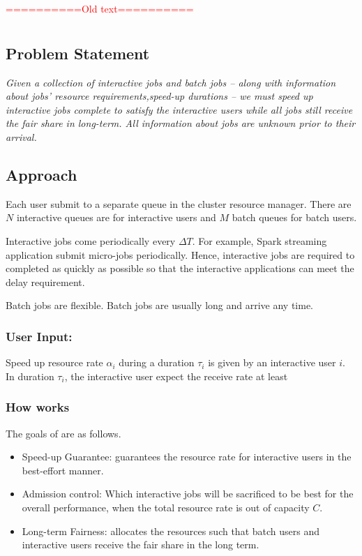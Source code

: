 \newpage

\textcolor{red}{==========Old text==========}

\section{}
\subsection{Problem Statement}
\emph{Given a collection of interactive jobs and batch jobs – along with information about jobs' resource requirements,speed-up durations – we must speed up interactive jobs complete to satisfy the interactive users while all jobs still receive the fair share in long-term. All information about jobs are unknown prior to their arrival.}

\subsection{Approach}

Each user submit to a separate queue in the cluster resource manager. There are $N$ interactive queues are for interactive users and $M$ batch queues for batch users. 

Interactive jobs come periodically every $\Delta T$. For example, Spark streaming application submit micro-jobs periodically. Hence, interactive jobs are required to completed as quickly as possible so that the interactive applications can meet the delay requirement.

Batch jobs are flexible. Batch jobs are usually long and arrive any time.   

\subsubsection*{User Input: }

Speed up resource rate $\alpha_i$ during a duration $\tau_i$ is given by an interactive user $i$. In duration $\tau_i$, the interactive user expect the receive rate at least  


\subsubsection*{How \name works}

The goals of \name are as follows.

\begin{itemize}
\item Speed-up Guarantee: \name guarantees the resource rate for interactive users in the best-effort manner. 
\item Admission control: Which interactive jobs will be sacrificed to be best for the overall performance, when the total resource rate is out of capacity $C$.
\item Long-term Fairness: \name allocates the resources such that batch users and interactive users receive the fair share in the long term.
\end{itemize}

